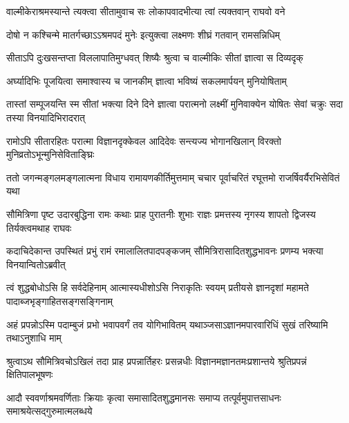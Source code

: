\twolineshloka
{वाल्मीकेराश्रमस्यान्ते त्यक्त्वा सीतामुवाच सः}
{लोकापवादभीत्या त्वां त्यक्तवान् राघवो वने} %

\twolineshloka
{दोषो न कश्चिन्मे मातर्गच्छाऽऽश्रमपदं मुनेः}
{इत्युक्त्वा लक्ष्मणः शीघ्रं गतवान् रामसन्निधिम्} %

\twolineshloka
{सीताऽपि दुःखसन्तप्ता विललापातिमुग्धवत्}
{शिष्यैः श्रुत्वा च वाल्मीकिः सीतां ज्ञात्वा स दिव्यदृक्} %

\twolineshloka
{अर्घ्यादिभिः पूजयित्वा समाश्वास्य च जानकीम्}
{ज्ञात्वा भविष्यं सकलमार्पयन् मुनियोषिताम्} %

\threelineshloka
{तास्तां सम्पूजयन्ति स्म सीतां भक्त्या दिने दिने}
{ज्ञात्वा परात्मनो लक्ष्मीं मुनिवाक्येन योषितः}
{सेवां चक्रुः सदा तस्या विनयादिभिरादरात्} %

\fourlineindentedshloka
{रामोऽपि सीतारहितः परात्मा}
{विज्ञानदृक्केवल आदिदेवः}
{सन्त्यज्य भोगानखिलान् विरक्तो}
{मुनिव्रतोऽभून्मुनिसेविताङ्घ्रिः} %






\fourlineindentedshloka
{ततो जगन्मङ्गलमङ्गलात्मना}
{विधाय रामायणकीर्तिमुत्तमाम्}
{चचार पूर्वाचरितं रघूत्तमो}
{राजर्षिवर्यैरभिसेवितं यथा} %

\fourlineindentedshloka
{सौमित्रिणा पृष्ट उदारबुद्धिना}
{रामः कथाः प्राह पुरातनीः शुभाः}
{राज्ञः प्रमत्तस्य नृगस्य शापतो}
{द्विजस्य तिर्यक्त्वमथाह राघवः} %

\fourlineindentedshloka
{कदाचिदेकान्त उपस्थितं प्रभुं}
{रामं रमालालितपादपङ्कजम्}
{सौमित्रिरासादितशुद्धभावनः}
{प्रणम्य भक्त्या विनयान्वितोऽब्रवीत्} %

\fourlineindentedshloka
{त्वं शुद्धबोधोऽसि हि सर्वदेहिनाम्}
{आत्मास्यधीशोऽसि निराकृतिः स्वयम्}
{प्रतीयसे ज्ञानदृशां महामते}
{पादाब्जभृङ्गाहितसङ्गसङ्गिनाम्} %

\fourlineindentedshloka
{अहं प्रपन्नोऽस्मि पदाम्बुजं प्रभो}
{भवापवर्गं तव योगिभावितम्}
{यथाञ्जसाऽज्ञानमपारवारिधिं}
{सुखं तरिष्यामि तथाऽनुशाधि माम्} %

\fourlineindentedshloka
{श्रुत्वाऽथ सौमित्रिवचोऽखिलं तदा}
{प्राह प्रपन्नार्तिहरः प्रसन्नधीः}
{विज्ञानमज्ञानतमःप्रशान्तये}
{श्रुतिप्रपन्नं क्षितिपालभूषणः} %

\fourlineindentedshloka
{आदौ स्ववर्णाश्रमवर्णिताः क्रियाः}
{कृत्वा समासादितशुद्धमानसः}
{समाप्य तत्पूर्वमुपात्तसाधनः}
{समाश्रयेत्सद्गुरुमात्मलब्धये} %

